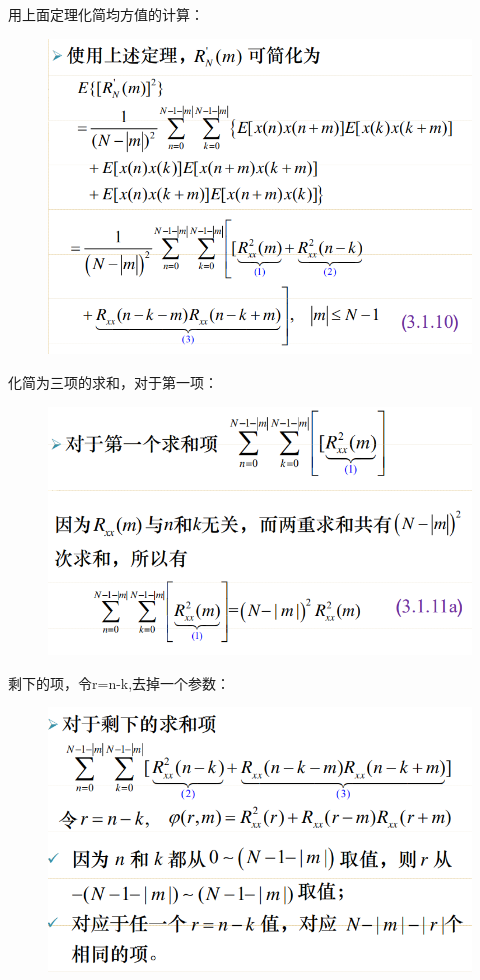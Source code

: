 \documentclass[UTF8]{ctexart} %
\begin{document}
				用上面定理化简均方值的计算：
				\begin{figure}[H]
					\centering\includegraphics[scale=0.4]{76.png}
				\end{figure}
				化简为三项的求和，对于第一项：
				\begin{figure}[H]
					\centering\includegraphics[scale=0.4]{77.png}
				\end{figure}
				剩下的项，令r=n-k,去掉一个参数：
				\begin{figure}[H]
					\centering\includegraphics[scale=0.4]{78.png}
				\end{figure}
\end{document}
